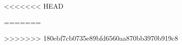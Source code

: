 \usepackage{color}
\usepackage{enumitem}
\usepackage{fancyhdr}
\usepackage{datetime}
\usepackage{courier}
\usepackage{titlesec}
\usepackage{tabularx}
<<<<<<< HEAD
\usepackage{todonotes}

\usepackage{parskip}
=======
\usepackage{pbox}
\usepackage[toc]{appendix}
>>>>>>> 180ebf7cb0735e89bfd6560aa870bb3970b919c8

